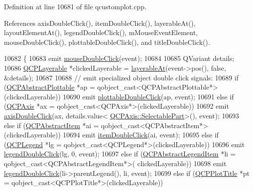Definition at line 10681 of file qcustomplot.\+cpp.



References axis\+Double\+Click(), item\+Double\+Click(), layerable\+At(), layout\+Element\+At(), legend\+Double\+Click(), m\+Mouse\+Event\+Element, mouse\+Double\+Click(), plottable\+Double\+Click(), and title\+Double\+Click().


\begin{DoxyCode}
10682 \{
10683   emit \hyperlink{class_q_custom_plot_a9b232142c64fcf273a953ee08e5b90e9}{mouseDoubleClick}(event);
10684   
10685   QVariant details;
10686   \hyperlink{class_q_c_p_layerable}{QCPLayerable} *clickedLayerable = \hyperlink{class_q_custom_plot_a3fffd1d8364f657482ae985e0b5aa028}{layerableAt}(event->pos(), \textcolor{keyword}{false}, &details);
10687   
10688   \textcolor{comment}{// emit specialized object double click signals:}
10689   \textcolor{keywordflow}{if} (\hyperlink{class_q_c_p_abstract_plottable}{QCPAbstractPlottable} *ap = qobject\_cast<QCPAbstractPlottable*>(clickedLayerable))
10690     emit \hyperlink{class_q_custom_plot_af2e6f1cea923dae437681d01ce7d0c31}{plottableDoubleClick}(ap, event);
10691   \textcolor{keywordflow}{else} \textcolor{keywordflow}{if} (\hyperlink{class_q_c_p_axis}{QCPAxis} *ax = qobject\_cast<QCPAxis*>(clickedLayerable))
10692     emit \hyperlink{class_q_custom_plot_a6df35357460181a72da3e93d600f5256}{axisDoubleClick}(ax, details.value<
      \hyperlink{class_q_c_p_axis_abee4c7a54c468b1385dfce2c898b115f}{QCPAxis::SelectablePart}>(), event);
10693   \textcolor{keywordflow}{else} \textcolor{keywordflow}{if} (\hyperlink{class_q_c_p_abstract_item}{QCPAbstractItem} *ai = qobject\_cast<QCPAbstractItem*>(clickedLayerable))
10694     emit \hyperlink{class_q_custom_plot_ac83aa9f5a3e9bb3efc9cdc763dcd42a6}{itemDoubleClick}(ai, event);
10695   \textcolor{keywordflow}{else} \textcolor{keywordflow}{if} (\hyperlink{class_q_c_p_legend}{QCPLegend} *lg = qobject\_cast<QCPLegend*>(clickedLayerable))
10696     emit \hyperlink{class_q_custom_plot_a0250f835c044521df1619b132288bca7}{legendDoubleClick}(lg, 0, event);
10697   \textcolor{keywordflow}{else} \textcolor{keywordflow}{if} (\hyperlink{class_q_c_p_abstract_legend_item}{QCPAbstractLegendItem} *li = qobject\_cast<QCPAbstractLegendItem*>(
      clickedLayerable))
10698     emit \hyperlink{class_q_custom_plot_a0250f835c044521df1619b132288bca7}{legendDoubleClick}(li->parentLegend(), li, event);
10699   \textcolor{keywordflow}{else} \textcolor{keywordflow}{if} (\hyperlink{class_q_c_p_plot_title}{QCPPlotTitle} *pt = qobject\_cast<QCPPlotTitle*>(clickedLayerable))

\end{DoxyCode}
